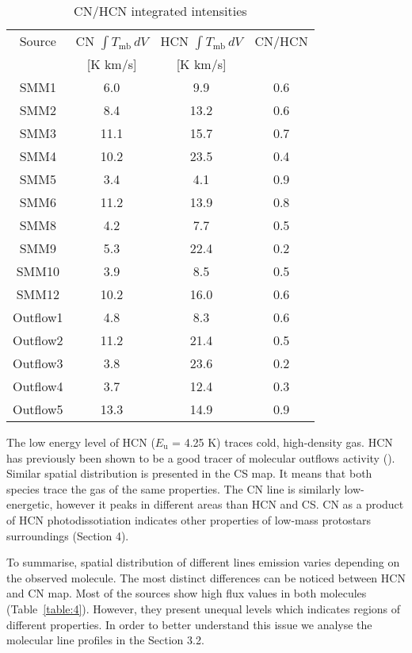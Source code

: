 \documentclass{aa}
\begin{document}
\begin{table}
\caption{CN/HCN integrated intensities}             %
\label{table:5}      %
\centering                          %
\begin{tabular}{c c c c} 
\hline\hline  
Source & CN $\int T_\mathrm{mb}\, dV$ & HCN $\int T_\mathrm{mb}\, dV$ & CN/HCN \\
& [K km/s] & [K km/s] & \\
\hline
SMM1 & 6.0 & 9.9 & 0.6 \\
SMM2 & 8.4 & 13.2 & 0.6 \\
SMM3 & 11.1 & 15.7 & 0.7 \\ 
SMM4 & 10.2 & 23.5 & 0.4\\
SMM5 & 3.4 & 4.1 & 0.9 \\
SMM6 & 11.2 & 13.9 & 0.8 \\ 
SMM8 & 4.2 & 7.7 & 0.5 \\
SMM9 & 5.3 & 22.4 & 0.2 \\
SMM10 & 3.9 & 8.5 & 0.5\\ 
SMM12 & 10.2 & 16.0 & 0.6 \\ \hdashline
Outflow1 & 4.8 & 8.3 & 0.6 \\
Outflow2 & 11.2 & 21.4 & 0.5 \\
Outflow3 & 3.8 & 23.6 & 0.2 \\
Outflow4 & 3.7 & 12.4 & 0.3 \\
Outflow5 & 13.3 & 14.9 & 0.9 \\
\hline
\end{tabular}
\end{table} 

The low energy level of HCN ($E_\mathrm{u}$ = 4.25 K) traces cold, high-density gas. HCN has previously been shown to be a good tracer of molecular outflows activity (\cite{Wal14}). Similar spatial distribution is presented in the CS map. It means that both species trace the gas of the same properties. The CN line is similarly low-energetic, however it peaks in different areas than HCN and CS. CN as a product of HCN photodissotiation indicates other properties of low-mass protostars surroundings (Section 4).

To summarise, spatial distribution of different lines emission varies depending on the observed molecule. The most distinct differences can be noticed between HCN and CN map. Most of the sources show high flux values in both molecules (Table~\ref{table:4}). However, they present unequal levels which indicates regions of different properties. In order to better understand this issue we analyse the molecular line profiles in the Section 3.2. 
\end{document}
